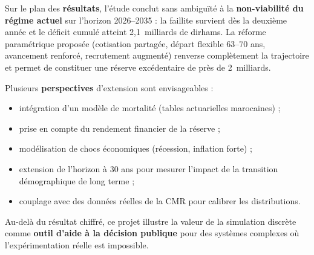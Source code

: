 \documentclass[12pt,a4paper,oneside]{report}
\begin{document}
Sur le plan des \textbf{résultats}, l'étude conclut sans ambiguïté à la
\textbf{non-viabilité du régime actuel} sur l'horizon 2026--2035 : la
faillite survient dès la deuxième année et le déficit cumulé atteint
2,1~milliards de dirhams. La réforme paramétrique proposée
(cotisation partagée, départ flexible 63--70 ans, avancement renforcé,
recrutement augmenté) renverse complètement la trajectoire et permet de
constituer une réserve excédentaire de près de 2~milliards.

Plusieurs \textbf{perspectives} d'extension sont envisageables :
\begin{itemize}
  \item intégration d'un modèle de mortalité (tables actuarielles
        marocaines) ;
  \item prise en compte du rendement financier de la réserve ;
  \item modélisation de chocs économiques (récession, inflation forte) ;
  \item extension de l'horizon à 30 ans pour mesurer l'impact de la
        transition démographique de long terme ;
  \item couplage avec des données réelles de la CMR pour calibrer les
        distributions.
\end{itemize}

Au-delà du résultat chiffré, ce projet illustre la valeur de la
simulation discrète comme \textbf{outil d'aide à la décision publique}
pour des systèmes complexes où l'expérimentation réelle est impossible.
\end{document}
